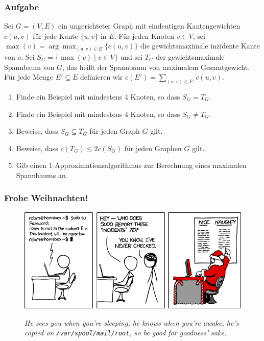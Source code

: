 \begin{frame}
	\frametitle{Aufgabe}
	
	Sei $G=(V,E)$ ein ungerichteter Graph mit eindeutigen Kantengewichten $c(u,v)$ für jede Kante $\{u,v\}$ in $E$.
Für jeden Knoten $v \in V$, sei $\max(v)=\arg\max_{(u,v)\in E}\{c(u,v)\}$ die gewichtsmaximale inzidente Kante von $v$.
Sei $S_G=\{\max(v) \mid v \in V\}$ und sei $T_G$ der gewichtsmaximale Spannbaum von $G$, das heißt der Spannbaum von maximalem Gesamtgewicht.
Für jede Menge $E' \subseteq E$ definieren wir $c(E')=\sum_{(u,v)\in E'}c(u,v)$.
\begin{enumerate}
 \item Finde ein Beispiel mit mindestens 4 Knoten, so dass $S_G=T_G$.
 \item Finde ein Beispiel mit mindestens 4 Knoten, so dass $S_G\not=T_G$.
 \item Beweise, dass $S_G\subseteq T_G$ für jeden Graph $G$ gilt.
 \item Beweise, dass $c(T_G)\leq 2c(S_G)$ für jeden Graphen $G$ gilt.
 \item Gib einen 1-Approximationsalgorithmus zur Berechnung eines maximalen Spannbaums an.
\end{enumerate}
\end{frame}

\begin{frame}
	\frametitle{Frohe Weihnachten!}
	
	\begin{figure}[H]
		
		
		\includegraphics[width= \textwidth]{images/838_incident.png}
		
		\textit{\scriptsize{He sees you when you're sleeping, he knows when you're awake, he's copied on \texttt{/var/spool/mail/root}, so be good for goodness' sake.}}
		
	\end{figure}
\end{frame}


